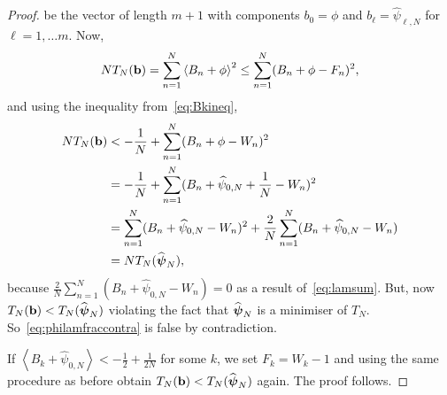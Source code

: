\documentclass[aap]{imsart}
\newcommand{\fracpart}[1]{\left\langle #1 \right\rangle}
\begin{document}
\begin{proof}
be the vector of length $m+1$ with components $b_0 = \phi$ and $b_\ell = \widehat{\psi}_{\ell,N}$ for $\ell = 1 , \dots m$.  Now,
\[
N T_N(\bbf) = \sum_{n=1}^N \fracpart{B_n + \phi }^2 \leq  \sum_{n=1}^N (B_n + \phi  - F_n)^2, 
\]
and using the inequality from~\eqref{eq:Bkineq},
\begin{align*}
N T_N(\bbf) &< - \frac{1}{N} + \sum_{n=1}^N (B_n + \phi  - W_n)^2 \\
&= - \frac{1}{N} + \sum_{n=1}^N (B_n + \widehat{\psi}_{0,N} + \frac{1}{N}  - W_n)^2 \\
&= \sum_{n=1}^N (B_n + \widehat{\psi}_{0,N}  - W_n)^2 +  \frac{2}{N}\sum_{n=1}^N (B_n + \widehat{\psi}_{0,N}  - W_n)\\
&= N T_N(\widehat{\psibf}_N),
\end{align*}
because $\frac{2}{N}\sum_{n=1}^N (B_n + \widehat{\psi}_{0,N}  - W_n) = 0$ as a result of~\eqref{eq:lamsum}.  But, now $T_N(\mathbf{b}) < T_N(\widehat{\boldsymbol{\psi}}_N)$ violating the fact that $\widehat{\boldsymbol{\psi}}_N$ is a minimiser of $T_N$.  So~\eqref{eq:philamfraccontra} is false by contradiction.

If $\fracpart{B_k + \widehat{\psi}_{0,N}} < -\frac{1}{2} + \frac{1}{2N}$ for some $k$, we set $F_k = W_k - 1$ and using the same procedure as before obtain $T_N(\mathbf{b}) < T_N(\widehat{\boldsymbol{\psi}}_N)$ again.  The proof follows.
\end{proof}
\end{document}
